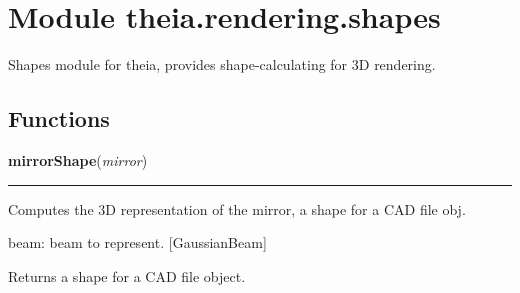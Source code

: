 %
%
%


\section{Module theia.rendering.shapes}

    \label{theia:rendering:shapes}
Shapes module for theia, provides shape-calculating for 3D rendering.



  \subsection{Functions}

    \label{theia:rendering:shapes:mirrorShape}

    \vspace{0.5ex}

\hspace{.8\funcindent}\begin{boxedminipage}{\funcwidth}

    \raggedright \textbf{mirrorShape}(\textit{mirror})

    \vspace{-1.5ex}

    \rule{\textwidth}{0.5\fboxrule}
\setlength{\parskip}{2ex}
    Computes the 3D representation of the mirror, a shape for a CAD file 
    obj.

    beam: beam to represent. [GaussianBeam]

    Returns a shape for a CAD file object.

\setlength{\parskip}{1ex}
    \end{boxedminipage}

